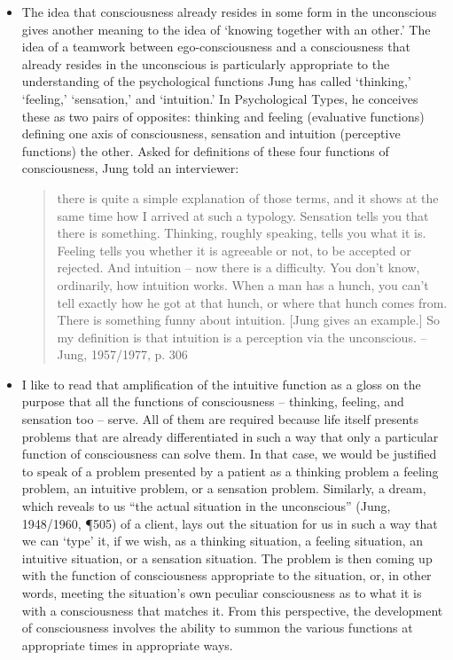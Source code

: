 \begin{itemize}
\item The idea that consciousness already resides in some form in the
unconscious gives another meaning to the idea of `knowing together with an
other.' The idea of a teamwork between ego-consciousness and a consciousness
that already resides in the unconscious is particularly appropriate to the
understanding of the psychological functions Jung has called `thinking,'
`feeling,' `sensation,' and `intuition.' In Psychological Types, he conceives
these as two pairs of opposites: thinking and feeling (evaluative functions)
defining one axis of consciousness, sensation and intuition (perceptive
functions) the other. Asked for definitions of these four functions of
consciousness, Jung told an interviewer:

\begin{quote}

there is quite a simple explanation of those terms, and it shows at the same
time how I arrived at such a typology. Sensation tells you that there is
something. Thinking, roughly speaking, tells you what it is. Feeling tells you
whether it is agreeable or not, to be accepted or rejected. And intuition --
now there is a difficulty. You don't know, ordinarily, how intuition works.
When a man has a hunch, you can't tell exactly how he got at that hunch, or
where that hunch comes from. There is something funny about intuition. [Jung
gives an example.] So my definition is that intuition is a perception via the
unconscious. -- Jung, 1957/1977, p. 306

\end{quote}

\item I like to read that amplification of the intuitive function as a gloss on
the purpose that all the functions of consciousness -- thinking, feeling, and
sensation too -- serve. All of them are required because life itself presents
problems that are already differentiated in such a way that only a particular
function of consciousness can solve them. In that case, we would be justified
to speak of a problem presented by a patient as a thinking problem a feeling
problem, an intuitive problem, or a sensation problem. Similarly, a dream,
which reveals to us ``the actual situation in the unconscious'' (Jung,
1948/1960, \P 505) of a client, lays out the situation for us in such a way
that we can `type' it, if we wish, as a thinking situation, a feeling
situation, an intuitive situation, or a sensation situation. The problem is
then coming up with the function of consciousness appropriate to the situation,
or, in other words, meeting the situation's own peculiar consciousness as to
what it is with a consciousness that matches it. From this perspective, the
development of consciousness involves the ability to summon the various
functions at appropriate times in appropriate ways.


\end{itemize}

